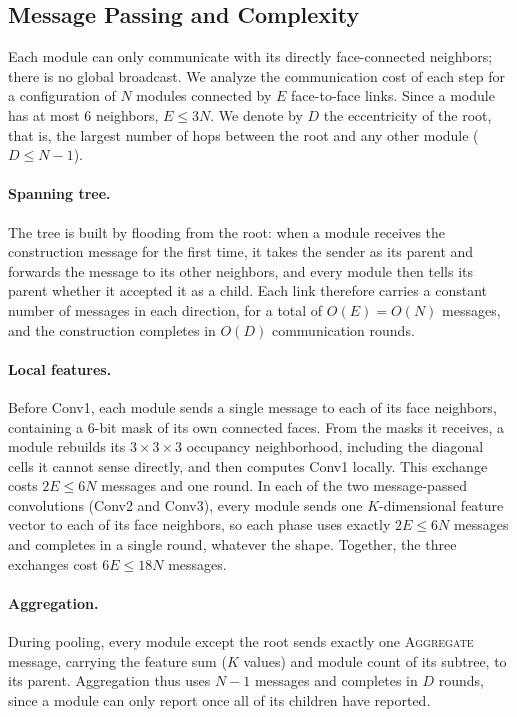 \documentclass[12pt]{article}
\begin{document}
\subsection{Message Passing and Complexity}
\label{sec:complexity}

Each module can only communicate with its directly face-connected neighbors; there is no global broadcast. We analyze the communication cost of each step for a configuration of $N$ modules connected by $E$ face-to-face links. Since a module has at most 6 neighbors, $E \le 3N$. We denote by $D$ the eccentricity of the root, that is, the largest number of hops between the root and any other module ($D \le N-1$).

\paragraph{Spanning tree.} The tree is built by flooding from the root: when a module receives the construction message for the first time, it takes the sender as its parent and forwards the message to its other neighbors, and every module then tells its parent whether it accepted it as a child. Each link therefore carries a constant number of messages in each direction, for a total of $O(E) = O(N)$ messages, and the construction completes in $O(D)$ communication rounds.

\paragraph{Local features.} Before Conv1, each module sends a single message to each of its face neighbors, containing a 6-bit mask of its own connected faces. From the masks it receives, a module rebuilds its $3\times3\times3$ occupancy neighborhood, including the diagonal cells it cannot sense directly, and then computes Conv1 locally. This exchange costs $2E \le 6N$ messages and one round. In each of the two message-passed convolutions (Conv2 and Conv3), every module sends one $K$-dimensional feature vector to each of its face neighbors, so each phase uses exactly $2E \le 6N$ messages and completes in a single round, whatever the shape. Together, the three exchanges cost $6E \le 18N$ messages.

\paragraph{Aggregation.} During pooling, every module except the root sends exactly one \textsc{Aggregate} message, carrying the feature sum ($K$ values) and module count of its subtree, to its parent. Aggregation thus uses $N-1$ messages and completes in $D$ rounds, since a module can only report once all of its children have reported.
\end{document}
